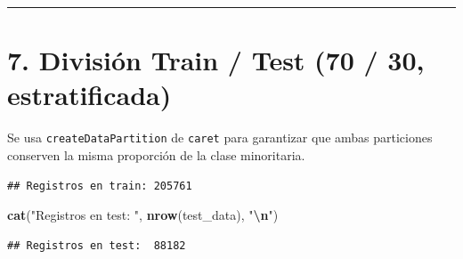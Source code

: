 \documentclass[
]{article}
\newenvironment{Shaded}{\begin{snugshade}}{\end{snugshade}}
\newcommand{\AttributeTok}[1]{\textcolor[rgb]{0.13,0.29,0.53}{#1}}
\newcommand{\ConstantTok}[1]{\textcolor[rgb]{0.56,0.35,0.01}{#1}}
\newcommand{\DecValTok}[1]{\textcolor[rgb]{0.00,0.00,0.81}{#1}}
\newcommand{\FloatTok}[1]{\textcolor[rgb]{0.00,0.00,0.81}{#1}}
\newcommand{\FunctionTok}[1]{\textcolor[rgb]{0.13,0.29,0.53}{\textbf{#1}}}
\newcommand{\NormalTok}[1]{#1}
\newcommand{\OtherTok}[1]{\textcolor[rgb]{0.56,0.35,0.01}{#1}}
\newcommand{\SpecialCharTok}[1]{\textcolor[rgb]{0.81,0.36,0.00}{\textbf{#1}}}
\newcommand{\StringTok}[1]{\textcolor[rgb]{0.31,0.60,0.02}{#1}}
\begin{document}
\begin{center}\rule{0.5\linewidth}{0.5pt}\end{center}

\section{7. División Train / Test (70 / 30,
estratificada)}\label{divisiuxf3n-train-test-70-30-estratificada}

Se usa \texttt{createDataPartition} de \texttt{caret} para garantizar
que ambas particiones conserven la misma proporción de la clase
minoritaria.

\begin{Shaded}
\end{Shaded}

\begin{verbatim}
## Registros en train: 205761
\end{verbatim}

\begin{Shaded}
\begin{Highlighting}[]
\FunctionTok{cat}\NormalTok{(}\StringTok{"Registros en test: "}\NormalTok{, }\FunctionTok{nrow}\NormalTok{(test\_data),  }\StringTok{"}\SpecialCharTok{\textbackslash{}n}\StringTok{"}\NormalTok{)}
\end{Highlighting}
\end{Shaded}

\begin{verbatim}
## Registros en test:  88182
\end{verbatim}
\end{document}
